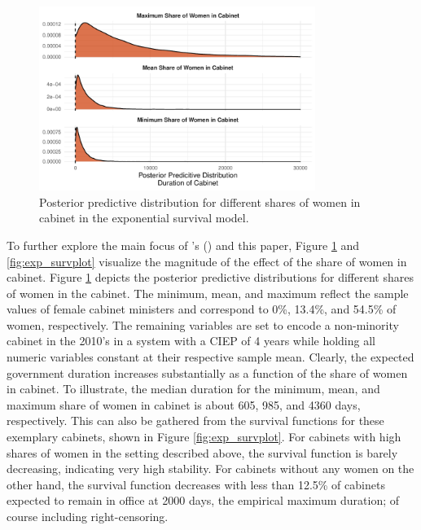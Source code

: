 \documentclass[11pt]{article}
\newcommand\possecite[1]{\citeauthor{#1}'s (\citeyear{#1})}
\newcommand\minp[1]{\begin{minipage}{0.8\textwidth} #1 \end{minipage}}
\begin{document}
\begin{figure}[!ht]
    \centering
    \minp{\caption{Posterior predictive distribution for different shares of women in cabinet in the exponential survival model.} \label{fig:exp_posteriorpredict}}
    \includegraphics[width = 0.8\textwidth]{figures/fig3_exp_posteriorpredict.pdf}
\end{figure}

To further explore the main focus of \possecite{KK20} and this paper, Figure \ref{fig:exp_posteriorpredict} and \ref{fig:exp_survplot} visualize the magnitude of the effect of the share of women in cabinet. Figure \ref{fig:exp_posteriorpredict} depicts the posterior predictive distributions for different shares of women in the cabinet. The minimum, mean, and maximum reflect the sample values of female cabinet ministers and correspond to 0\%, 13.4\%, and 54.5\% of women, respectively. The remaining variables are set to encode a non-minority cabinet in the 2010's in a system with a CIEP of 4 years while holding all numeric variables constant at their respective sample mean. Clearly, the expected government duration increases substantially as a function of the share of women in cabinet. To illustrate, the median duration for the minimum, mean, and maximum share of women in cabinet is about 605, 985, and 4360 days, respectively. This can also be gathered from the survival functions for these exemplary cabinets, shown in Figure \ref{fig:exp_survplot}. For cabinets with high shares of women in the setting described above, the survival function is barely decreasing, indicating very high stability. For cabinets without any women on the other hand, the survival function decreases with less than 12.5\% of cabinets expected to remain in office at 2000 days, the empirical maximum duration; of course including right-censoring.
\end{document}
